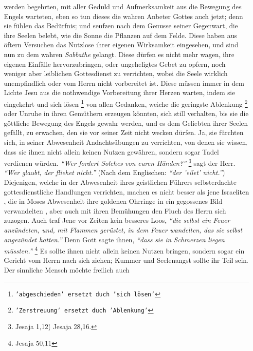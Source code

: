 werden begehrten, mit aller Geduld und Aufmerksamkeit aus die Bewegung des
Engels warteten, eben so tun dieses die wahren Anbeter Gottes auch jetzt; denn
sie fühlen das Bedürfnis; und seufzen nach dem Genusse seiner Gegenwart, die
ihre Seelen belebt, wie die Sonne die Pflanzen auf dem Felde. Diese haben aus
öftern Versuchen das Nutzlose ihrer eigenen Wirksamkeit eingesehen, und sind nun
zu dem wahren \textit{Sabbathe}  gelangt. Diese dürfen es nicht
mehr wagen, ihre
eigenen Einfälle hervorzubringen, oder ungeheligtes Gebet zu opfern, noch
weniger aber leiblichen Gottesdienst zu verrichten, wobei die Seele wirklich
unempfindlich oder vom Herrn nicht vorbereitet ist. Diese müssen immer in dem
Lichte Jesu  aus die nothwendige Vorbereitung ihrer Herzen
warten, indem sie
eingekehrt und sich lösen \footnote{\texttt{'abgeschieden' ersetzt duch 'sich
lösen'}} von allen Gedanken, weiche die geringste Ablenkung
\footnote{\texttt{'Zerstreuung' ersetzt duch 'Ablenkung'}}
oder Unruhe in ihren Gemüthern erzeugen könnten, sich still verhalten, bis sie
die göttliche Bewegung des Engels gewahr werden, und es dem Geliebten ihrer
Seelen gefällt, zu erwachen, den sie vor seiner Zeit nicht wecken dürfen. Ja,
sie fürchten sich, in seiner Abwesenheit Andachtsübungen zu verrichten, von
denen sie wissen, dass sie ihnen nicht allein keinen Nutzen gewähren, sondern
sogar Tadel verdienen würden.
\textit{"`Wer fordert Solches von euren Händen?"'}
\footnote{Jesaja 1,12) Jesaja 28,16.}
sagt der Herr.
\textit{"`Wer glaubt, der fliehet nicht."'} (Nach dem Englischen: \textit{"`der
'eilet' nicht."'}) Diejenigen,
welche in der Abwesenheit ihres geistlichen Führers selbsterdachte
gottesdienstliche Handlungen verrichten, machen es nicht besser als jene
Israeliten , die in Moses 
Abwesenheit ihre goldenen Ohrringe in ein
gegossenes Bild verwandelten , aber auch mit ihren
Bemühungen den Fluch  des Herrn sich zuzogen. Auch traf Jene vor
Zeiten kein besseres Loos,
\textit{"`die selbst ein Feuer anzündeten, und, mit Flammen gerüstet, in dem
Feuer wandelten, das sie
selbst angezündet hatten."'} Denn Gott sagte ihnen,
\textit{"`dass sie in Schmerzen liegen müssten."'}
\footnote{Jesaja 50,11}
Es sollte ihnen nicht allein keinen
Nutzen bringen, sondern sogar ein Gericht vom Herrn nach sich ziehen; Kummer und
Seelenangst sollte ihr Teil sein. Der sinnliche Mensch  möchte freilich auch
